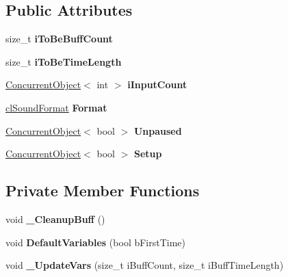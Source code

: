 \subsection*{Public Attributes}
\begin{DoxyCompactItemize}
\item 
\hypertarget{classcl_input_device_a32b4df3ca9feddfa3af306ca7a0b6810}{
size\_\-t {\bfseries iToBeBuffCount}}
\label{classcl_input_device_a32b4df3ca9feddfa3af306ca7a0b6810}

\item 
\hypertarget{classcl_input_device_af6819904a482f55538b67724a858b2a3}{
size\_\-t {\bfseries iToBeTimeLength}}
\label{classcl_input_device_af6819904a482f55538b67724a858b2a3}

\item 
\hypertarget{classcl_input_device_a5ed2989a31fa67e0891642d125fa88ae}{
\hyperlink{class_concurrent_object}{ConcurrentObject}$<$ int $>$ {\bfseries iInputCount}}
\label{classcl_input_device_a5ed2989a31fa67e0891642d125fa88ae}

\item 
\hypertarget{classcl_input_device_a22c7ad34995b25275a8a18ec65a9b926}{
\hyperlink{structcl_sound_format}{clSoundFormat} {\bfseries Format}}
\label{classcl_input_device_a22c7ad34995b25275a8a18ec65a9b926}

\item 
\hypertarget{classcl_input_device_a7dcd9ee21df8ca40dd7f08528ddb2ca5}{
\hyperlink{class_concurrent_object}{ConcurrentObject}$<$ bool $>$ {\bfseries Unpaused}}
\label{classcl_input_device_a7dcd9ee21df8ca40dd7f08528ddb2ca5}

\item 
\hypertarget{classcl_input_device_afad8f967fb492306c3d10c723abe9695}{
\hyperlink{class_concurrent_object}{ConcurrentObject}$<$ bool $>$ {\bfseries Setup}}
\label{classcl_input_device_afad8f967fb492306c3d10c723abe9695}

\end{DoxyCompactItemize}
\subsection*{Private Member Functions}
\begin{DoxyCompactItemize}
\item 
\hypertarget{classcl_input_device_a5c975a25cce552a704a3472c4b3fd3a0}{
void {\bfseries \_\-CleanupBuff} ()}
\label{classcl_input_device_a5c975a25cce552a704a3472c4b3fd3a0}

\item 
\hypertarget{classcl_input_device_aff7d78e76b333c7d24315b5d12f7b996}{
void {\bfseries DefaultVariables} (bool bFirstTime)}
\label{classcl_input_device_aff7d78e76b333c7d24315b5d12f7b996}

\item 
\hypertarget{classcl_input_device_a4bc8078608b962edbb8463533210297e}{
void {\bfseries \_\-UpdateVars} (size\_\-t iBuffCount, size\_\-t iBuffTimeLength)}
\label{classcl_input_device_a4bc8078608b962edbb8463533210297e}

\end{DoxyCompactItemize}
